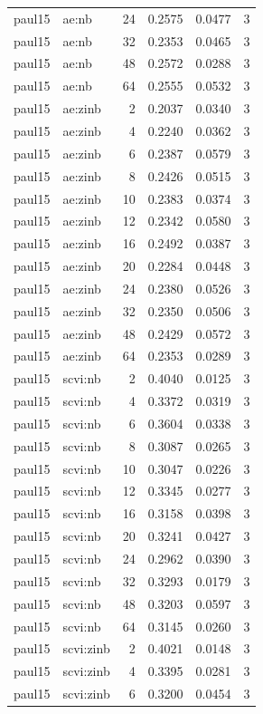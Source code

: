 \begin{tabular}{llrrrr}
paul15 & ae:nb & 24 & 0.2575 & 0.0477 & 3 \\
paul15 & ae:nb & 32 & 0.2353 & 0.0465 & 3 \\
paul15 & ae:nb & 48 & 0.2572 & 0.0288 & 3 \\
paul15 & ae:nb & 64 & 0.2555 & 0.0532 & 3 \\
paul15 & ae:zinb & 2 & 0.2037 & 0.0340 & 3 \\
paul15 & ae:zinb & 4 & 0.2240 & 0.0362 & 3 \\
paul15 & ae:zinb & 6 & 0.2387 & 0.0579 & 3 \\
paul15 & ae:zinb & 8 & 0.2426 & 0.0515 & 3 \\
paul15 & ae:zinb & 10 & 0.2383 & 0.0374 & 3 \\
paul15 & ae:zinb & 12 & 0.2342 & 0.0580 & 3 \\
paul15 & ae:zinb & 16 & 0.2492 & 0.0387 & 3 \\
paul15 & ae:zinb & 20 & 0.2284 & 0.0448 & 3 \\
paul15 & ae:zinb & 24 & 0.2380 & 0.0526 & 3 \\
paul15 & ae:zinb & 32 & 0.2350 & 0.0506 & 3 \\
paul15 & ae:zinb & 48 & 0.2429 & 0.0572 & 3 \\
paul15 & ae:zinb & 64 & 0.2353 & 0.0289 & 3 \\
paul15 & scvi:nb & 2 & 0.4040 & 0.0125 & 3 \\
paul15 & scvi:nb & 4 & 0.3372 & 0.0319 & 3 \\
paul15 & scvi:nb & 6 & 0.3604 & 0.0338 & 3 \\
paul15 & scvi:nb & 8 & 0.3087 & 0.0265 & 3 \\
paul15 & scvi:nb & 10 & 0.3047 & 0.0226 & 3 \\
paul15 & scvi:nb & 12 & 0.3345 & 0.0277 & 3 \\
paul15 & scvi:nb & 16 & 0.3158 & 0.0398 & 3 \\
paul15 & scvi:nb & 20 & 0.3241 & 0.0427 & 3 \\
paul15 & scvi:nb & 24 & 0.2962 & 0.0390 & 3 \\
paul15 & scvi:nb & 32 & 0.3293 & 0.0179 & 3 \\
paul15 & scvi:nb & 48 & 0.3203 & 0.0597 & 3 \\
paul15 & scvi:nb & 64 & 0.3145 & 0.0260 & 3 \\
paul15 & scvi:zinb & 2 & 0.4021 & 0.0148 & 3 \\
paul15 & scvi:zinb & 4 & 0.3395 & 0.0281 & 3 \\
paul15 & scvi:zinb & 6 & 0.3200 & 0.0454 & 3 \\

\end{tabular}

